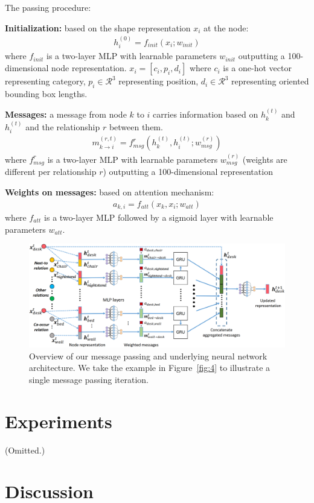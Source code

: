 \documentclass[10pt]{article}
\newcommand{\Fig}[1]{Figure~\ref{fig:#1}}
\begin{document}
The passing procedure:

\textbf{Initialization:} based on the shape representation $x_i$ at the node:
%
\begin{align}
  \label{eq:1}
  h^{(0)}_i = f_{init}(x_i; w_{init})
\end{align}
%
where $f_{init}$ is a two-layer MLP with learnable parameters $w_{init}$
outputting a 100-dimensional node representation. $x_i = [c_i, p_i, d_i]$
where $c_i$ is a one-hot vector representing category,
$p_i \in \mathcal{R^3}$ representing position, $d_i \in \mathcal{R^3}$
representing oriented bounding box lengths.

\textbf{Messages:} a message from node $k$ to $i$ carries information based on
$h^{(t)}_k$ and $h^{(t)}_i$ and the relationship $r$ between them.
%
\begin{align}
  \label{eq:2}
  m^{(r,t)}_{k \rightarrow i} = f^{r}_{msg}(h^{(t)}_k, h^{(t)}_i; w^{(r)}_{msg})
\end{align}
%
where $f^{r}_{msg}$ is a two-layer MLP with learnable parameters
$w^{(r)}_{msg}$ (weights are different per relationship $r$) outputting a
100-dimensional representation

\textbf{Weights on messages:} based on attention mechanism:
%
\begin{align}
  \label{eq:3}
  a_{k,i} = f_{att}(x_k, x_i; w_{att})
\end{align}
%
where $f_{att}$ is a two-layer MLP followed by a sigmoid layer with learnable
parameters $w_{att}$.

\begin{figure}[htpb]
  \centering
  \includegraphics[width=0.8\linewidth]{fig_5.png}
  \caption{Overview of our message passing and underlying neural network
    architecture. We take the example in \Fig{4} to illustrate a single message
    passing iteration.}%
  \label{fig:5}
\end{figure}

\section{Experiments}%
\label{sec:experiments}
(Omitted.)


\section{Discussion}%
\label{sec:discussion}
\end{document}
